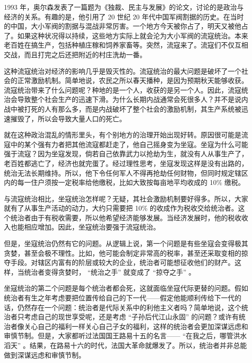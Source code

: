 1993 年，奥尔森发表了一篇题为《独裁、民主与发展》的论文，讨论的是政治与经济的关系。有趣的是，他引用了 20 世纪 20 年代中国军阀割据的历史。在当时的中国，大小军阀的割据与混战非常厉害。一个地方今天被你占了，明天又被他占了。如果这种状况得以持续，这些地方实际上就会沦为大小军阀的流寇统治。本来老百姓在搞生产，包括种植庄稼和饲养家畜等。突然，流寇来了。流寇们不仅互相交战，而且打完之后还把附近的村庄洗劫一番。

这种流寇统治对经济的影响几乎是毁灭性的。流寇统治的最大问题是破坏了一个社会的正常激励机制。简单地说，农民之所以春天播种，是因为预期秋天能够收获。流寇统治带来了什么问题呢？种地的是一个人，收获的是另一个人。因此，流寇统治会导致整个社会生产的迅速下滑。为什么长期内战通常会死很多人？并不是说内战中被打死的人有那么多，而是内战破坏了整个社会的激励机制，其生产系统被迅速摧毁了，所以会导致大量人口的死亡。

就在这种政治混乱的情形里头，有个别地方的治理开始出现好转。原因很可能是流寇中的某个强有力者把其他流寇都赶走了，他自己摇身变为坐寇。坐寇为什么可能强于流寇？因为坐寇发现，倘若自己依靠武力以抢劫为生，就没有人从事生产了，老百姓都逃亡了，经济也就完蛋了。经过理性思考，坐寇发现这样是没有出路的，统治无法长期维持。所以，他下令任何军人不得再抢劫任何财物，但同时规定辖区内的每一住户须按一定税率给他缴税，比如大致按每亩地平均收成的 10\% 缴税。

与流寇统治相比，坐寇统治怎样呢？无疑，其社会激励机制要好得多。所以，大家就有了从事生产活动的动力，大约只需要把 10\% 的收成作为税收交给统治者。这个统治者由于有税收需要，所以他希望经济能够发展。当经济发展时，他的税收收入也能相应增加。因此，坐寇统治要强于流寇统治。

但是，坐寇统治仍然有它的问题。从逻辑上说，第一个问题是有些坐寇会变得极其贪婪，甚至会极不理性。比如，他可能会制定非常高的税率，甚至还采取变相的掠夺手段。对辖区内富有的阶层或较大的企业，统治者可能想征收他们的财产。这样，当统治者变得贪婪时， “统治之手” 就变成了 “掠夺之手” 。

坐寇统治的第二个问题是每个统治者都会死，这就面临坐寇代际更替的问题。假如统治者有生之年考虑要把位置传给自己的下一代——假定他能顺利传给下一代的话，仍然存在一个问题：统治者是代际关系中的利他主义者吗？简单地说，这个统治者只考虑自己的现世享受呢，还是考虑 “子孙后代江山永固” 的问题？或许有统治者像关心自己的福利一样关心自己子女的福利，这样的统治者会更加深谋远虑和审慎节制。但是，大家都听过法国国王路易十五的名言—— “在我之后，哪管洪水滔天” 。结果，在路易十六的时代，法国大革命就爆发了。所以，统治者并非总能做到深谋远虑和审慎节制。

